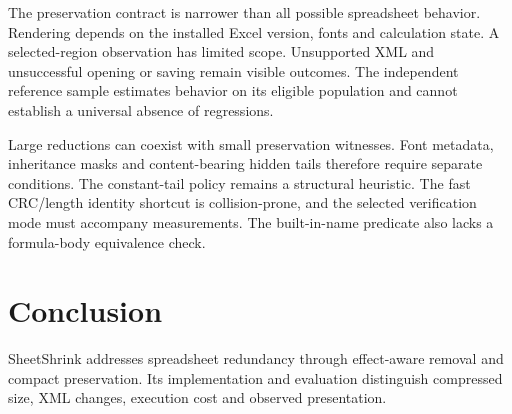 The preservation contract is narrower than all possible spreadsheet behavior.
Rendering depends on the installed Excel version, fonts and calculation state.
A selected-region observation has limited scope. Unsupported XML and unsuccessful
opening or saving remain visible outcomes. The independent reference sample
estimates behavior on its eligible population and cannot establish a universal
absence of regressions.

Large reductions can coexist with small preservation witnesses. Font metadata,
inheritance masks and content-bearing hidden tails therefore require separate
conditions. The constant-tail policy remains a structural heuristic. The fast
CRC/length identity shortcut is collision-prone, and the selected verification
mode must accompany measurements. The built-in-name predicate also lacks a
formula-body equivalence check.

\section{Conclusion}
SheetShrink addresses spreadsheet redundancy through effect-aware removal and
compact preservation. Its implementation and evaluation distinguish compressed
size, XML changes, execution cost and observed presentation.
